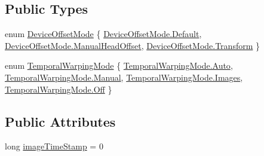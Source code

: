 \subsection*{Public Types}
\begin{DoxyCompactItemize}
\item 
enum \mbox{\hyperlink{class_leap_1_1_unity_1_1_leap_x_r_service_provider_afb41f717d7d9f36bbc119f06440b83f6}{Device\+Offset\+Mode}} \{ \mbox{\hyperlink{class_leap_1_1_unity_1_1_leap_x_r_service_provider_afb41f717d7d9f36bbc119f06440b83f6a7a1920d61156abc05a60135aefe8bc67}{Device\+Offset\+Mode.\+Default}}, 
\mbox{\hyperlink{class_leap_1_1_unity_1_1_leap_x_r_service_provider_afb41f717d7d9f36bbc119f06440b83f6aa0693fd102e7bc29edd357e925eb64ad}{Device\+Offset\+Mode.\+Manual\+Head\+Offset}}, 
\mbox{\hyperlink{class_leap_1_1_unity_1_1_leap_x_r_service_provider_afb41f717d7d9f36bbc119f06440b83f6a2ff4148554480a37f85efd299df04850}{Device\+Offset\+Mode.\+Transform}}
 \}
\item 
enum \mbox{\hyperlink{class_leap_1_1_unity_1_1_leap_x_r_service_provider_aa0f64056dec7a8f478070ab21de3247f}{Temporal\+Warping\+Mode}} \{ \mbox{\hyperlink{class_leap_1_1_unity_1_1_leap_x_r_service_provider_aa0f64056dec7a8f478070ab21de3247fa06b9281e396db002010bde1de57262eb}{Temporal\+Warping\+Mode.\+Auto}}, 
\mbox{\hyperlink{class_leap_1_1_unity_1_1_leap_x_r_service_provider_aa0f64056dec7a8f478070ab21de3247fae1ba155a9f2e8c3be94020eef32a0301}{Temporal\+Warping\+Mode.\+Manual}}, 
\mbox{\hyperlink{class_leap_1_1_unity_1_1_leap_x_r_service_provider_aa0f64056dec7a8f478070ab21de3247fafff0d600f8a0b5e19e88bfb821dd1157}{Temporal\+Warping\+Mode.\+Images}}, 
\mbox{\hyperlink{class_leap_1_1_unity_1_1_leap_x_r_service_provider_aa0f64056dec7a8f478070ab21de3247fad15305d7a4e34e02489c74a5ef542f36}{Temporal\+Warping\+Mode.\+Off}}
 \}
\end{DoxyCompactItemize}
\subsection*{Public Attributes}
\begin{DoxyCompactItemize}
\item 
long \mbox{\hyperlink{class_leap_1_1_unity_1_1_leap_x_r_service_provider_a9b2a2eca314859615f53181b46e09c76}{image\+Time\+Stamp}} = 0
\end{DoxyCompactItemize}
